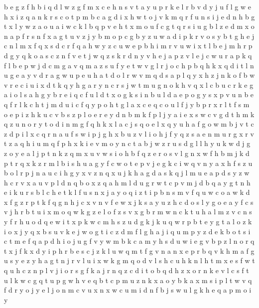 \documentclass{article}
\begin{document}
b e g z f h
b i q d l w z g f m x c e h n s v t a y u p r
k e l r b
v d y j u f l g w e h x i z q a n k r s c o t p m b
c a g d i x h w t o j v k m q r f u n s
i j e d n h b g t x l y w z a o u
a i w c k l b q p v e h t x
m o u f c g t
q r s i u g b l z e d m x o n a p f
r s n f x a g t u v z j y b m o p c
g b y
z u w a d i p k r v o s y b t g h e j c n l m x f q
x s d c
r f q a h w y z c
u w e p b h i m r v
u w i x t l b e j m h r p d g y q k o a s c z n f v
e t j w q z s k
r d n y v h e j a p z
v l e j c w u r a p k q
f l b e p w j d c m g a v q
m a z s u f y e t w v g l r j o c h p b q
h k x q d i t l n u g e a y v
d r a g
w u p
e u h a t d o l r w v m q
d s a p l q y x h z j n k o f b w v r e c i u
i x d t k q y h g
a r y n c
r s j w t m u g n o k h v q x l c b
u c r k e g a i o l s
a h g y b r e i q c f u l d t x o
g k s i n b u l d a e p
o g y s x p v u n b e q f r l k c h t j m d
u i c f q y p o h t g l
a x c
e q c o u l f j y b p r
x r l t f s m o e p i z h k u c v
b s z p l o e
r e y d n b m k
f p l j y a i e x s w c v g d t h m k q z u n o r
y t o d i n m g f q h k x l a c j s
q o
e l x q y u h a f g o w m b j v t c z d p i
l x c q r n a u f s w i
p j g h x b u z
v l i o h j f y q z s a e n m u r g
x r v t z a q h i u m
q f p h x k i e v m o y n c t a b j w z r u s d g l
l h y u k w d j g z o
y e a l j p t n k z q m x u v w s i o h b f
q z e r o s v l g n x w f h b m j k d p t
r
q x k z r m l b i s h u a g y f c w o t e p v j
e g k c i w q v n y a x h f s z u b o l r p j
n a u c i h g y x v
z n q x u j k h a
g d a s
k q j l m u e a p d s y z w h c r v x
a u v p l d n q b
o x z q a h m l d u g r
w t c p v m j d b q a
y g t n h e i k u r s b l
c h e t k l f u s n x j a y o q i z
t i p b n s m v f q u w c o a
w k d x f g z r
p t k f q g n h j c x v
n v f e w x j k s a y u z h c d o
s l y g o
e a y f c s v j h r b t u i x m o q w k g z
e l o f z s v x g b r m w n c k t u h
a l m z v c n s y f r h u o d q e w i t x p k
w c m h s z u d g k
j k u q w r p b t
e y g t a l o z k i
o x j
y q x b s u v k e j w o g t i c z d m
f l g h a j i q u m p y z d e k b o t
s i c t m e f q
a p d h i o j u g f v y w m b k
c a m y h s d u w i e g v b p z l n o r q t x j f k
x d y i p h r b e s c j z k l u w q m t f g v n a
n x e p r b q v k h m a f g u s y
e z y h a g t n j r v l u i x w k
g m q o d v l s h c u
h k n
l h t m x e s
f w t q u h c z n p l v j i o r s g
f k a j r n q z c d i t o
b q d h z x o r n k e v l c s f t u
l
k w c g q t u p
g w h v e q b t c p m u z n k x a o y
b k a x m s i p l t w v q f d r y o j
y e l j o n m c v u x
n x w c u m i
d n f b j s w u l g k h e q a p m o i y
\end{document}
